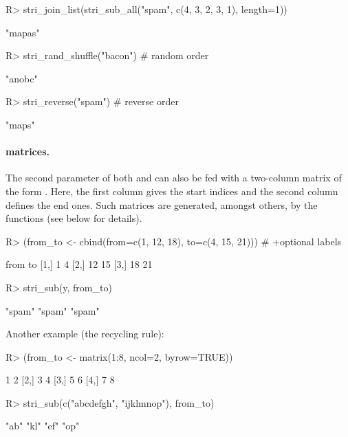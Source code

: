\documentclass[nojss]{jss}
\begin{document}
\begin{Schunk}
\begin{Sinput}
R> stri_join_list(stri_sub_all("spam", c(4, 3, 2, 3, 1), length=1))
\end{Sinput}
\begin{Soutput}
[1] "mapas"
\end{Soutput}
\begin{Sinput}
R> stri_rand_shuffle("bacon")  # random order
\end{Sinput}
\begin{Soutput}
[1] "anobc"
\end{Soutput}
\begin{Sinput}
R> stri_reverse("spam")        # reverse order
\end{Sinput}
\begin{Soutput}
[1] "maps"
\end{Soutput}
\end{Schunk}




\paragraph{ matrices.}
The second parameter of both  and 
can also be fed with a two-column matrix
of the form . Here, the first column
gives the start indices and the second column defines the end ones.
Such matrices are generated, amongst others, by the 
functions (see below for details).

\begin{Schunk}
\begin{Sinput}
R> (from_to <- cbind(from=c(1, 12, 18), to=c(4, 15, 21))) # +optional labels
\end{Sinput}
\begin{Soutput}
     from to
[1,]    1  4
[2,]   12 15
[3,]   18 21
\end{Soutput}
\begin{Sinput}
R> stri_sub(y, from_to)
\end{Sinput}
\begin{Soutput}
[1] "spam" "spam" "spam"
\end{Soutput}
\end{Schunk}


\noindent Another example (the recycling rule):

\begin{Schunk}
\begin{Sinput}
R> (from_to <- matrix(1:8, ncol=2, byrow=TRUE))
\end{Sinput}
\begin{Soutput}
     [,1] [,2]
[1,]    1    2
[2,]    3    4
[3,]    5    6
[4,]    7    8
\end{Soutput}
\begin{Sinput}
R> stri_sub(c("abcdefgh", "ijklmnop"), from_to)
\end{Sinput}
\begin{Soutput}
[1] "ab" "kl" "ef" "op"
\end{Soutput}
\end{Schunk}
\end{document}
